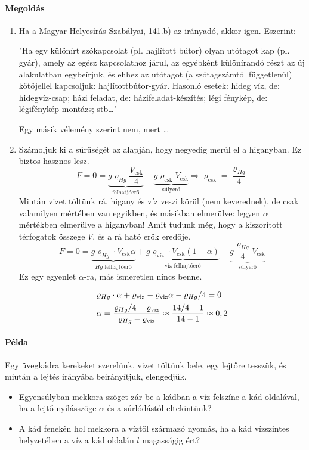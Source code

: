 \documentclass[12pt,a4paper]{scrartcl}
\begin{document}
\paragraph{Megoldás}
\begin{enumerate}
\item Ha a Magyar Helyesírás Szabályai, 141.b) az irányadó, akkor igen. Eszerint:

"Ha egy különírt szókapcsolat (pl. hajlított bútor) olyan utótagot kap (pl. gyár), amely az egész kapcsolathoz járul, az egyébként különírandó részt az új alakulatban egybeírjuk, és ehhez az utótagot (a szótagszámtól függetlenül) kötőjellel kapcsoljuk: hajlítottbútor-gyár. Hasonló esetek: hideg víz, de: hidegvíz-csap; házi feladat, de: házifeladat-készítés; légi fénykép, de: légifénykép-montázs; stb\ldots"

Egy másik vélemény szerint nem, mert \ldots
\item Számoljuk ki a sűrűségét az alapján, hogy negyedig merül el a higanyban. Ez biztos hasznos lesz.
\[F = 0 = \underbrace {g{\varrho _{Hg}}\frac{{{V_{{\text{csk}}}}}}{4}}_{{\text{felhatjóerő}}} - \underbrace {g{\varrho _{{\text{csk}}}}{V_{{\text{csk}}}}}_{{\text{súlyerő}}} \Rightarrow {\varrho _{{\text{csk}}}} = \frac{{{\varrho _{Hg}}}}{4}\]
Miután vizet töltünk rá, higany és víz veszi körül (nem keverednek), de csak valamilyen mértében van egyikben, és másikban elmerülve: legyen $\alpha$ mértékben elmerülve a higanyban! Amit tudunk még, hogy a kiszorított térfogatok összege $V$, és a rá ható erők eredője.
\[F = 0 = \underbrace {g{\varrho _{Hg}}\cdot{V_{{\text{csk}}}} \alpha }_{Hg{\text{ felhajtóerő}}} + \underbrace {g{\varrho _{{\text{víz}}}}\cdot{V_{{\text{csk}}}} \left( {1 - \alpha } \right)}_{{\text{víz felhajtóerő}}} - \underbrace {g\frac{{{\varrho _{Hg}}}}{4}{V_{{\text{csk}}}}}_{{\text{súlyerő}}}\]
Ez egy egyenlet $\alpha$-ra, más ismeretlen nincs benne.

\[\begin{gathered}
  {\varrho _{Hg}} \cdot \alpha  + {\varrho _{{\text{viz}}}} - {\varrho _{{\text{viz}}}}\alpha  - {\varrho _{Hg}}/4 = 0 \hfill \\
  \alpha  = \frac{{{\varrho _{Hg}}/4 - {\varrho _{{\text{viz}}}}}}{{{\varrho _{Hg}} - {\varrho _{{\text{viz}}}}}} \approx \frac{{14/4 - 1}}{{14 - 1}} \approx 0,2 \hfill \\ 
\end{gathered} \]
\end{enumerate}

\paragraph{Példa}
Egy üvegkádra kerekeket szerelünk, vizet töltünk bele, egy lejtőre tesszük, és miután a lejtés irányába beirányítjuk, elengedjük.
\begin{itemize}
\item  Egyensúlyban mekkora szöget zár be a kádban a víz felszíne a kád oldalával, ha a lejtő nyílásszöge $\alpha$ és a súrlódástól eltekintünk?
\item A kád fenekén hol mekkora a víztől származó nyomás, ha a kád vízszintes helyzetében a víz a kád oldalán $l$ magasságig ért?
\end{itemize}
\end{document}
